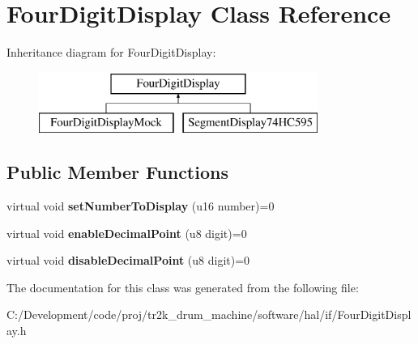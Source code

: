 \hypertarget{class_four_digit_display}{}\section{Four\+Digit\+Display Class Reference}
\label{class_four_digit_display}
Inheritance diagram for Four\+Digit\+Display\+:\begin{figure}[H]
\begin{center}
\leavevmode
\includegraphics[height=2.000000cm]{class_four_digit_display}
\end{center}
\end{figure}
\subsection*{Public Member Functions}
\begin{DoxyCompactItemize}
\item 
\mbox{\label{class_four_digit_display_a32ca43d20e2253ff51a1b23700c4cb13}} 
virtual void {\bfseries set\+Number\+To\+Display} (u16 number)=0
\item 
\mbox{\label{class_four_digit_display_af6258c4601f0f028025a7a0c4905b79b}} 
virtual void {\bfseries enable\+Decimal\+Point} (u8 digit)=0
\item 
\mbox{\label{class_four_digit_display_ac06686283c5486b98f95c32603b15662}} 
virtual void {\bfseries disable\+Decimal\+Point} (u8 digit)=0
\end{DoxyCompactItemize}


The documentation for this class was generated from the following file\+:\begin{DoxyCompactItemize}
\item 
C\+:/\+Development/code/proj/tr2k\+\_\+drum\+\_\+machine/software/hal/if/Four\+Digit\+Display.\+h\end{DoxyCompactItemize}
